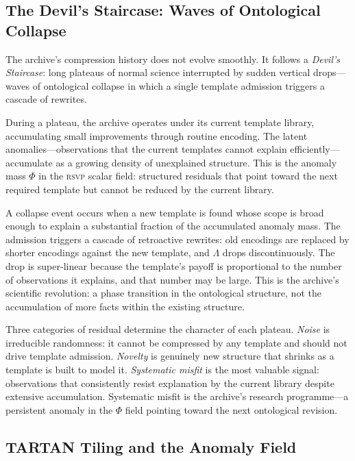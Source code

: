 \documentclass[12pt, letterpaper]{article}
\theoremstyle{remark}
\newcommand{\rsvp}{\textsc{rsvp}}
\begin{document}
\subsection{The Devil's Staircase: Waves of Ontological Collapse}

The archive's compression history does not evolve smoothly.  It follows a
\emph{Devil's Staircase}: long plateaus of normal science interrupted by
sudden vertical drops---waves of ontological collapse in which a single
template admission triggers a cascade of rewrites.

During a plateau, the archive operates under its current template library,
accumulating small improvements through routine encoding.  The latent
anomalies---observations that the current templates cannot explain
efficiently---accumulate as a growing density of unexplained structure.
This is the anomaly mass $\Phi$ in the \rsvp{} scalar field: structured
residuals that point toward the next required template but cannot be reduced
by the current library.

A collapse event occurs when a new template is found whose scope is broad
enough to explain a substantial fraction of the accumulated anomaly mass.
The admission triggers a cascade of retroactive rewrites: old encodings are
replaced by shorter encodings against the new template, and $\Lambda$ drops
discontinuously.  The drop is super-linear because the template's payoff
is proportional to the number of observations it explains, and that number
may be large.  This is the archive's scientific revolution: a phase
transition in the ontological structure, not the accumulation of more
facts within the existing structure.

Three categories of residual determine the character of each plateau.
\emph{Noise} is irreducible randomness: it cannot be compressed by any
template and should not drive template admission.  \emph{Novelty} is
genuinely new structure that shrinks as a template is built to model it.
\emph{Systematic misfit} is the most valuable signal: observations that
consistently resist explanation by the current library despite extensive
accumulation.  Systematic misfit is the archive's research programme---a
persistent anomaly in the $\Phi$ field pointing toward the next ontological
revision.

\subsection{TARTAN Tiling and the Anomaly Field}
\end{document}
